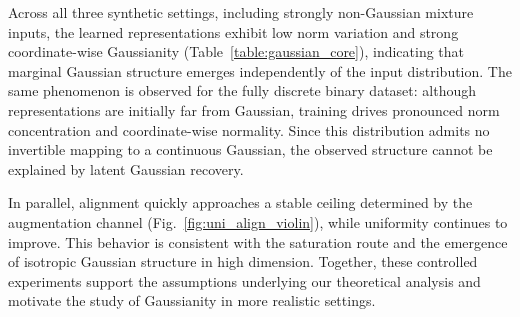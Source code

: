 \documentclass{article}
\begin{document}
Across all three synthetic settings, including strongly non-Gaussian mixture inputs, the learned representations exhibit low norm variation and strong coordinate-wise Gaussianity (Table~\ref{table:gaussian_core}), indicating that marginal Gaussian structure emerges independently of the input distribution. The same phenomenon is observed for the fully discrete binary dataset: although representations are initially far from Gaussian, training drives pronounced norm concentration and coordinate-wise normality. Since this distribution admits no invertible mapping to a continuous Gaussian, the observed structure cannot be explained by latent Gaussian recovery.

In parallel, alignment quickly approaches a stable ceiling determined by the augmentation channel (Fig.~\ref{fig:uni_align_violin}), while uniformity continues to improve. This behavior is consistent with the saturation route and the emergence of isotropic Gaussian structure in high dimension. Together, these controlled experiments support the assumptions underlying our theoretical analysis and motivate the study of Gaussianity in more realistic settings.
\end{document}
